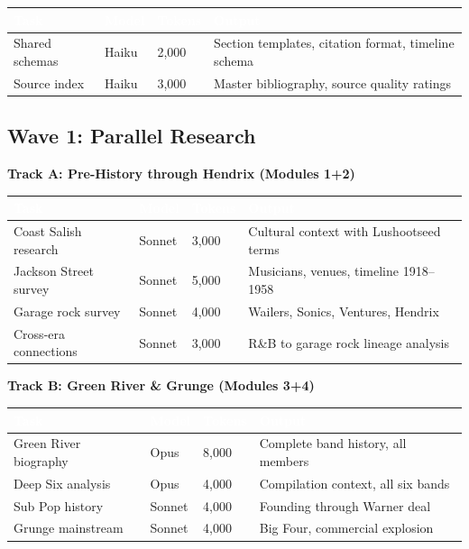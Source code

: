 \documentclass[11pt,letterpaper]{article}
\newcommand{\tableheader}[1]{\textbf{\sffamily\textcolor{white}{#1}}}
\begin{document}
\begin{center}
\begin{tabularx}{\textwidth}{L{3cm}L{2cm}C{1.5cm}X}
\toprule
{}
\tableheader{Task} & \tableheader{Model} & \tableheader{Tokens} & \tableheader{Output} \\
\midrule
Shared schemas & Haiku & 2,000 & Section templates, citation format, timeline schema \\
Source index & Haiku & 3,000 & Master bibliography, source quality ratings \\
\bottomrule
\end{tabularx}
\end{center}

\subsection{Wave 1: Parallel Research}

\textbf{Track A: Pre-History through Hendrix (Modules 1+2)}

\begin{center}
\begin{tabularx}{\textwidth}{L{3cm}L{2cm}C{1.5cm}X}
\toprule
{}
\tableheader{Task} & \tableheader{Model} & \tableheader{Tokens} & \tableheader{Output} \\
\midrule
Coast Salish research & Sonnet & 3,000 & Cultural context with Lushootseed terms \\
Jackson Street survey & Sonnet & 5,000 & Musicians, venues, timeline 1918--1958 \\
Garage rock survey & Sonnet & 4,000 & Wailers, Sonics, Ventures, Hendrix \\
Cross-era connections & Sonnet & 3,000 & R\&B to garage rock lineage analysis \\
\bottomrule
\end{tabularx}
\end{center}

\textbf{Track B: Green River \& Grunge (Modules 3+4)}

\begin{center}
\begin{tabularx}{\textwidth}{L{3cm}L{2cm}C{1.5cm}X}
\toprule
{}
\tableheader{Task} & \tableheader{Model} & \tableheader{Tokens} & \tableheader{Output} \\
\midrule
Green River biography & Opus & 8,000 & Complete band history, all members \\
Deep Six analysis & Opus & 4,000 & Compilation context, all six bands \\
Sub Pop history & Sonnet & 4,000 & Founding through Warner deal \\
Grunge mainstream & Sonnet & 4,000 & Big Four, commercial explosion \\
\bottomrule
\end{tabularx}
\end{center}
\end{document}
